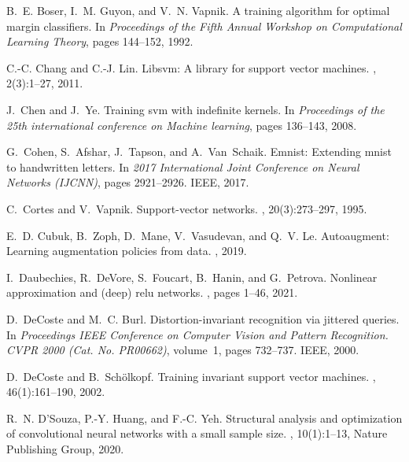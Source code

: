 \documentclass{article}
\theoremstyle{plain}
\theoremstyle{definition}
\theoremstyle{remark}
\begin{document}
% 

\begin{thebibliography}{10}

B.~E. Boser, I.~M. Guyon, and V.~N. Vapnik.
\newblock A training algorithm for optimal margin classifiers.
\newblock In {\em Proceedings of the Fifth Annual Workshop on Computational
  Learning Theory}, pages 144--152, 1992.

C.-C. Chang and C.-J. Lin.
\newblock Libsvm: A library for support vector machines.
,
  2(3):1--27, 2011.

J.~Chen and J.~Ye.
\newblock Training svm with indefinite kernels.
\newblock In {\em Proceedings of the 25th international conference on Machine
  learning}, pages 136--143, 2008.

G.~Cohen, S.~Afshar, J.~Tapson, and A.~Van~Schaik.
\newblock Emnist: Extending mnist to handwritten letters.
\newblock In {\em 2017 International Joint Conference on Neural Networks
  (IJCNN)}, pages 2921--2926. IEEE, 2017.

C.~Cortes and V.~Vapnik.
\newblock Support-vector networks.
, 20(3):273--297, 1995.

E.~D. Cubuk, B.~Zoph, D.~Mane, V.~Vasudevan, and Q.~V. Le.
\newblock Autoaugment: Learning augmentation policies from data.
, 2019.

I.~Daubechies, R.~DeVore, S.~Foucart, B.~Hanin, and G.~Petrova.
\newblock Nonlinear approximation and (deep) relu networks.
, pages 1--46, 2021.

D.~DeCoste and M.~C. Burl.
\newblock Distortion-invariant recognition via jittered queries.
\newblock In {\em Proceedings IEEE Conference on Computer Vision and Pattern
  Recognition. CVPR 2000 (Cat. No. PR00662)}, volume~1, pages 732--737. IEEE,
  2000.

D.~DeCoste and B.~Sch{\"o}lkopf.
\newblock Training invariant support vector machines.
, 46(1):161--190, 2002.

R.~N. D’{S}ouza, P.-Y. Huang, and F.-C. Yeh.
\newblock Structural analysis and optimization of convolutional neural networks
  with a small sample size.
, 10(1):{1--13, Nature Publishing Group},
  2020.


\end{thebibliography}
\end{document}
